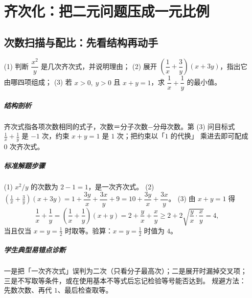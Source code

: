 \chapter{齐次化：把二元问题压成一元比例}

\section{次数扫描与配比：先看结构再动手}

\begin{problem}
(1) 判断 $\dfrac{x^2}{y}$ 是几次齐次式，并说明理由；
(2) 展开 $\left(\dfrac1x+\dfrac3y\right)(x+3y)$，指出它由哪四项组成；
(3) 若 $x>0,\ y>0$ 且 $x+y=1$，求 $\dfrac1x+\dfrac1y$ 的最小值。
\end{problem}
\begin{solution}
\paragraph{结构剖析}
齐次式指各项次数相同的式子，次数＝分子次数$-$分母次数。第 (3) 问目标式
$\frac1x+\frac1y$ 是 $-1$ 次，约束 $x+y=1$ 是 $1$ 次；把约束以「$1$ 的代换」
乘进去即可配成 $0$ 次齐次式。
\paragraph{标准解题步骤}
(1) $x^2/y$ 的次数为 $2-1=1$，是一次齐次式。
(2) $\left(\frac1x+\frac3y\right)(x+3y)=1+\dfrac{3y}{x}+\dfrac{3x}{y}+9
=10+\dfrac{3y}{x}+\dfrac{3x}{y}$。
(3) 由 $x+y=1$ 得
\[
  \frac1x+\frac1y=\left(\frac1x+\frac1y\right)(x+y)
  =2+\frac yx+\frac xy\ge2+2\sqrt{\frac yx\cdot\frac xy}=4,
\]
当且仅当 $x=y=\frac12$ 时取等。验算：$x=y=\frac12$ 时值为 $4$。
\paragraph{学生典型易错点诊断}
一是把「一次齐次式」误判为二次（只看分子最高次）；二是展开时漏掉交叉项；
三是不写取等条件，或在使用基本不等式后忘记检验等号能否达到。
规避方法：先数次数、再代 $1$、最后检查取等。
\end{solution}

